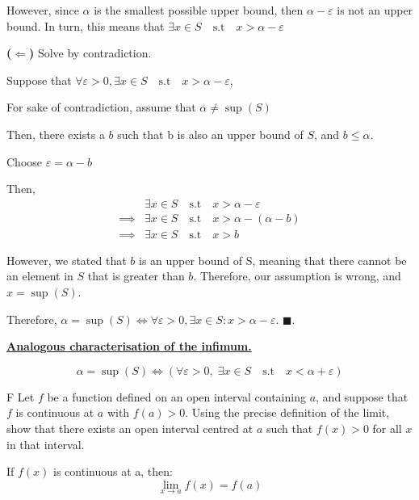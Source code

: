 \documentclass[]{article}
\begin{document}
However, since $\alpha$ is the smallest possible upper bound, then $\alpha - \varepsilon$ is not an upper bound. In turn, this means that
$\exists x \in S \quad \text{s.t} \quad x > \alpha - \varepsilon$


\medskip

\noindent \textbf{($\Leftarrow$)}  
Solve by contradiction.

Suppose that $\forall\varepsilon>0,\exists x \in S \quad \text{s.t} \quad x > \alpha - \varepsilon$,

For sake of contradiction, assume that $\alpha \ne \sup(S)$

Then, there exists a $b$ such that b is also an upper bound of $S$, and $b \le \alpha$.

Choose $\varepsilon = \alpha - b$

Then, 
\begin{align*}
    &\exists x \in S \quad \text{s.t} \quad x > \alpha - \varepsilon \\
    \implies&\exists x \in S \quad \text{s.t} \quad x > \alpha - (\alpha - b) \\
    \implies&\exists x \in S \quad \text{s.t} \quad x > b
\end{align*}

However, we stated that $b$ is an upper bound of S, meaning that there cannot be an element in $S$ that is
greater than $b$. Therefore, our assumption is wrong, and $x = \sup(S)$.

\medskip

Therefore, $\alpha = \sup(S) \iff \forall \varepsilon > 0, \exists x \in S : x > \alpha - \varepsilon$. $\blacksquare$.


\medskip

\underline{\textbf{Analogous characterisation of the infimum.}}

\[
    \alpha = \sup(S) \iff (\forall \varepsilon > 0,\; \exists x \in S \quad \text{s.t} \quad x < \alpha + \varepsilon)
\]
\begin{question}{F}
      Let $f$ be a function defined on an open interval containing $a$, and
suppose that $f$ is continuous at $a$ with $f(a) > 0$. Using the precise
definition of the limit, show that there exists an open interval centred
at $a$ such that $f(x) > 0$ for all $x$ in that interval.


\end{question}      

If $f(x)$ is continuous at a, then:
\[
    \lim_{x\to a} f(x) = f(a)
\]
\end{document}
